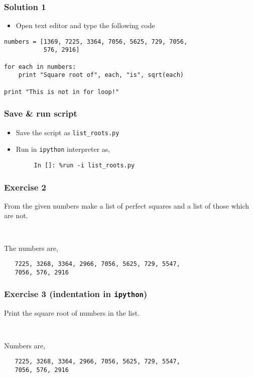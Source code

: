 \documentclass[presentation]{beamer}
\begin{document}
\begin{frame}[fragile]
\frametitle{Solution 1}
\label{sec-4}

\begin{itemize}
\item Open text editor and type the following code
\end{itemize}

\begin{verbatim}
numbers = [1369, 7225, 3364, 7056, 5625, 729, 7056, 
           576, 2916]

for each in numbers:
    print "Square root of", each, "is", sqrt(each)

print "This is not in for loop!"
\end{verbatim}
\end{frame}
\begin{frame}[fragile]
\frametitle{Save \& run script}
\label{sec-5}

\begin{itemize}
\item Save the script as \texttt{list\_roots.py}
\item Run in \texttt{ipython} interpreter as,
\begin{verbatim}
     In []: %run -i list_roots.py
\end{verbatim}

\end{itemize}
\end{frame}
\begin{frame}[fragile]
\frametitle{Exercise 2}
\label{sec-6}

  From the given numbers make a list of perfect squares and a list of those which are not.
\begin{verbatim}
   
\end{verbatim}

  The numbers are,
\begin{verbatim}
   7225, 3268, 3364, 2966, 7056, 5625, 729, 5547, 
   7056, 576, 2916
\end{verbatim}
\end{frame}
\begin{frame}[fragile]
\frametitle{Exercise 3 (indentation in \texttt{ipython})}
\label{sec-7}

  Print the square root of numbers in the list.
\begin{verbatim}
   
\end{verbatim}

  Numbers are,
\begin{verbatim}
   7225, 3268, 3364, 2966, 7056, 5625, 729, 5547, 
   7056, 576, 2916
\end{verbatim}
\end{frame}
\end{document}
